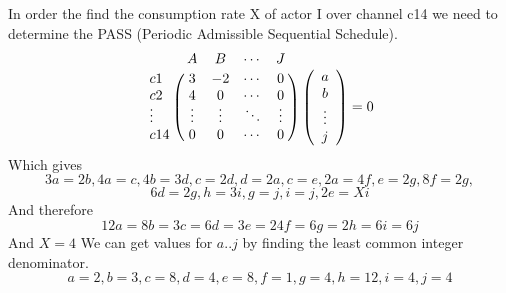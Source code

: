 \documentclass{article}
\begin{document}
In order the find the consumption rate X of actor I over channel c14 we need to determine the PASS (Periodic Admissible Sequential Schedule).
\[
\bordermatrix{~ & A & B & \cdots & J \cr
              c1 & 3 & -2 & \cdots & 0 \cr
              c2 & 4 & 0 & \cdots & 0 \cr
              \vdots & \vdots & \vdots & \ddots & \vdots \cr
              c14 & 0 & 0 & \cdots & 0 \cr}
    \left( \begin{array}{ccc}
     a \\
     b \\
     \vdots \\
     j
    \end{array} \right) = 0
\]
Which gives
\[3a = 2b, 4a = c, 4b = 3d, c = 2d, d = 2a, c = e, 2a = 4f, e = 2g, 8f = 2g,\]
\[6d = 2g, h = 3i, g = j, i = j, 2e = Xi\]
And therefore
\[12a = 8b = 3c = 6d = 3e = 24f = 6g = 2h = 6i = 6j\]
And $X = 4$
We can get values for $a..j$ by finding the least common integer denominator.
\[a = 2, b = 3, c = 8, d = 4, e = 8, f = 1, g = 4, h = 12, i = 4, j = 4\]

\subsection{}
\end{document}
